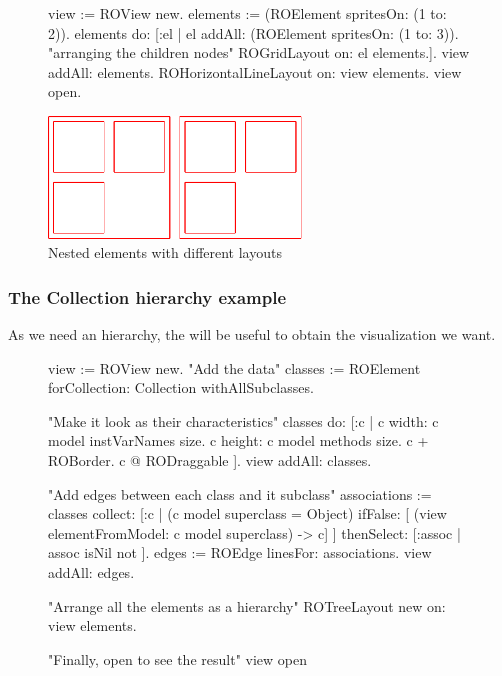 \documentclass[a4paper,10pt,twoside]{book}
\begin{document}
\begin{figure}[H]
      \begin{minipage}[t]{0.61\textwidth}
      \vspace{0pt}
     \begin{code}{}
view := ROView new.
elements := (ROElement spritesOn: (1 to: 2)).
elements 
	do: [:el | el addAll: (ROElement spritesOn: (1 to: 3)). 
	           "arranging the children nodes"
			   ROGridLayout on: el elements.].			   
view addAll: elements.
ROHorizontalLineLayout on: view elements.
view open.
  \end{code}
   \end{minipage}
   \hfill
   \begin{minipage}[t]{0.6\textwidth}
      \vspace{0pt} \raggedright
       \centering
		\includegraphics[width=0.6\textwidth]{nestedLayout}
   \end{minipage}
\label{fig:nestedLayout}
\caption{Nested elements with different layouts }
\end{figure} 

\subsubsection*{The Collection hierarchy example}
As we need an hierarchy, the  will be useful to obtain the visualization we want.
\begin{figure}[H]
\begin{code}{}
view := ROView new.
"Add the data"
classes := ROElement forCollection: Collection withAllSubclasses.

"Make it look as their characteristics"
classes do: [:c | 
	c width: c model instVarNames size.
	c height: c model methods size.
	c + ROBorder. 
	c @ RODraggable ].
view addAll: classes.

"Add edges between each class and it subclass"
associations := classes collect: [:c | 
	(c model superclass = Object)
		ifFalse: [ (view elementFromModel: c model superclass) -> c]
	 ] thenSelect: [:assoc | assoc isNil not ].
edges := ROEdge linesFor: associations.
view addAll: edges.

"Arrange all the elements as a hierarchy"
ROTreeLayout new on: view elements.

"Finally, open to see the result"
view open
\end{code}
\end{figure}
\end{document}
